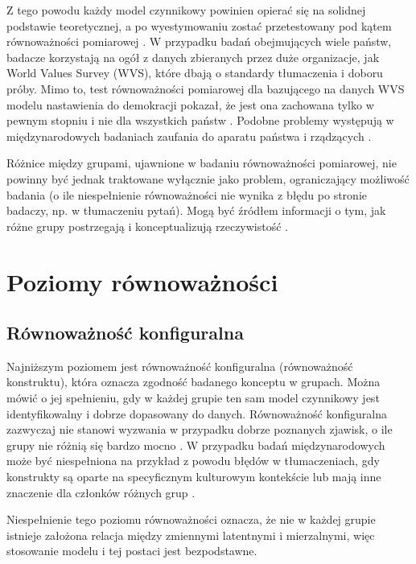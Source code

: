 \documentclass[12pt]{article}
\begin{document}
Z tego powodu każdy model czynnikowy powinien opierać się na solidnej podstawie teoretycznej, a po wyestymowaniu zostać przetestowany pod kątem równoważności pomiarowej \citep{LubGlog}. W przypadku badań obejmujących wiele państw, badacze korzystają na ogół z danych zbieranych przez duże organizacje, jak World Values Survey (WVS), które dbają o standardy tłumaczenia i doboru próby. Mimo to, test równoważności pomiarowej dla bazującego na danych WVS modelu nastawienia do demokracji pokazał, że jest ona zachowana tylko w pewnym stopniu i nie dla wszystkich państw \citep{ArDav}. Podobne problemy występują w międzynarodowych badaniach zaufania do aparatu państwa i rządzących \citep{Schneider}.

Różnice między grupami, ujawnione w badaniu równoważności pomiarowej, nie powinny być jednak traktowane wyłącznie jako problem, ograniczający możliwość badania (o ile niespełnienie równoważności nie wynika z błędu po stronie badaczy, np. w tłumaczeniu pytań). Mogą być źródłem informacji o tym, jak różne grupy postrzegają i konceptualizują rzeczywistość \citep{CheungRens}.

\hypertarget{poziomy-ruxf3wnowaux17cnoux15bci}{%
\section{Poziomy równoważności}\label{poziomy-ruxf3wnowaux17cnoux15bci}}

\hypertarget{ruxf3wnowaux17cnoux15bux107-konfiguralna}{%
\subsection{Równoważność konfiguralna}\label{ruxf3wnowaux17cnoux15bux107-konfiguralna}}

Najniższym poziomem jest równoważność konfiguralna (równoważność konstruktu), która oznacza zgodność badanego konceptu w grupach. Można mówić o jej spełnieniu, gdy w każdej grupie ten sam model czynnikowy jest identyfikowalny i dobrze dopasowany do danych. Równoważność konfiguralna zazwyczaj nie stanowi wyzwania w przypadku dobrze poznanych zjawisk, o ile grupy nie różnią się bardzo mocno \citep{LubGlog}. W przypadku badań międzynarodowych może być niespełniona na przykład z powodu błędów w tłumaczeniach, gdy konstrukty są oparte na specyficznym kulturowym kontekście lub mają inne znaczenie dla członków różnych grup \citep{CheungRens}.

Niespełnienie tego poziomu równoważności oznacza, że nie w każdej grupie istnieje założona relacja między zmiennymi latentnymi i mierzalnymi, więc stosowanie modelu i tej postaci jest bezpodstawne.
\end{document}
